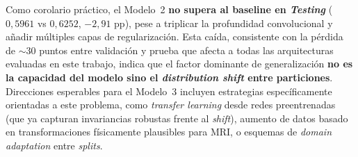 Como corolario práctico, el Modelo~2 \textbf{no supera al
baseline en \textit{Testing}} ($0{,}5961$ vs $0{,}6252$,
$-2{,}91$ pp), pese a triplicar la profundidad convolucional y
añadir múltiples capas de regularización. Esta caída,
consistente con la pérdida de $\sim 30$ puntos entre validación
y prueba que afecta a todas las arquitecturas evaluadas en
este trabajo, indica que el factor dominante de generalización
\textbf{no es la capacidad del modelo sino el \textit{distribution
shift} entre particiones}. Direcciones esperables para el
Modelo~3 incluyen estrategias específicamente orientadas a este
problema, como \textit{transfer learning} desde redes
preentrenadas (que ya capturan invariancias robustas frente al
\textit{shift}), aumento de datos basado en transformaciones
físicamente plausibles para MRI, o esquemas de
\textit{domain adaptation} entre \textit{splits}.
